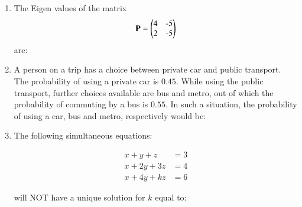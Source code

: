 \documentclass[journal]{IEEEtran}
\begin{document}
\begin{enumerate}
\item The Eigen values of the matrix \hfill {}
\begin{align}
\mathbf{P} = \myvec{$4$ & $-5$ \\ $2$ & $-5$}
\end{align}
are:
\begin{enumerate}
\end{enumerate}

\item A person on a trip has a choice between private car and public transport. The probability of using a private car is $0.45$. While using the public transport, further choices available are bus and metro, out of which the probability of commuting by a bus is $0.55$. In such a situation, the probability  of using a car, bus and metro, respectively would be: \hfill {}
\begin{enumerate}
\end{enumerate}

\item The following simultaneous equations: 

\begin{align}
x + y + z &= 3 \\
x + 2y + 3z &= 4 \\
x + 4y + kz &= 6
\end{align}

will NOT have a unique solution for $k$ equal to: \hfill {}
\begin{enumerate}
\end{enumerate}


\end{enumerate}
\end{document}
